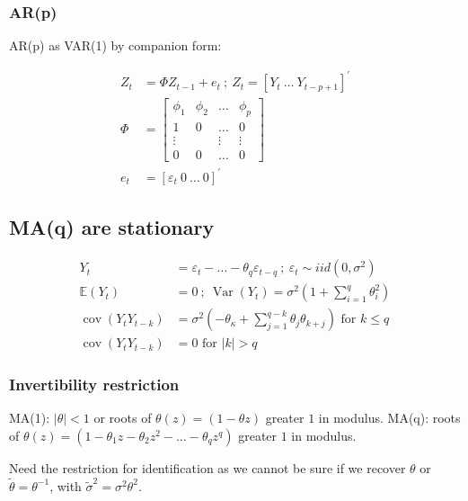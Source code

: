\subsubsection{AR(p)}

AR(p) as VAR(1) by companion form:

\begin{align*}
    Z_t&=\Phi Z_{t-1}+e_t \: ; \: Z_t= \left[Y_t \: \ldots \: Y_{t-p+1} \right]^\prime \\
    \Phi&= \left[ \begin{array}{llll}
    \phi_1 & \phi_2 & \ldots & \phi_p \\
    1 & 0 & \ldots & 0 \\
    \vdots & & \vdots & \vdots \\
    0 & 0 & \ldots & 0
    \end{array} \right]\\
    e_t&= \left[ \varepsilon_t \: 0 \: \ldots \: 0\right]^\prime
\end{align*}

\subsection{MA(q) are stationary}

\begin{align*}
    Y_t&=\varepsilon_t-\ldots-\theta_q \varepsilon_{t-q} \:;\:
    \varepsilon_t \sim i i d\left(0, \sigma^2\right) \\
    \mathbb{E}\left(Y_t\right)&=0 \: ; \:
    \operatorname{Var}\left(Y_t\right) =\sigma^2\left(1+\sum_{i=1}^q \theta_i^2\right) \\
    \operatorname{cov}\left(Y_t Y_{t-k}\right)&=\sigma^2\left(-\theta_\kappa+\sum_{j=1}^{q-k} \theta_j \theta_{k+j}\right) \text{ for } k\leq q \\
    \operatorname{cov}\left(Y_t Y_{t-k}\right)&=0 \text { for }|k|>q
\end{align*}

\subsubsection{Invertibility restriction}

MA(1): $|\theta|<1$ or roots of $\theta(z)=(1-\theta z)$ greater $1$ in modulus.
MA(q): roots of $\theta(z)=\left(1-\theta_1 z-\theta_2 z^2-\ldots-\theta_q z^q\right)$ greater $1$ in modulus.

Need the restriction for identification as we cannot be sure if we recover $\theta$ or $\tilde{\theta}=\theta^{-1}$, with $\tilde{\sigma}^2 = \sigma^2 \theta^2$.

